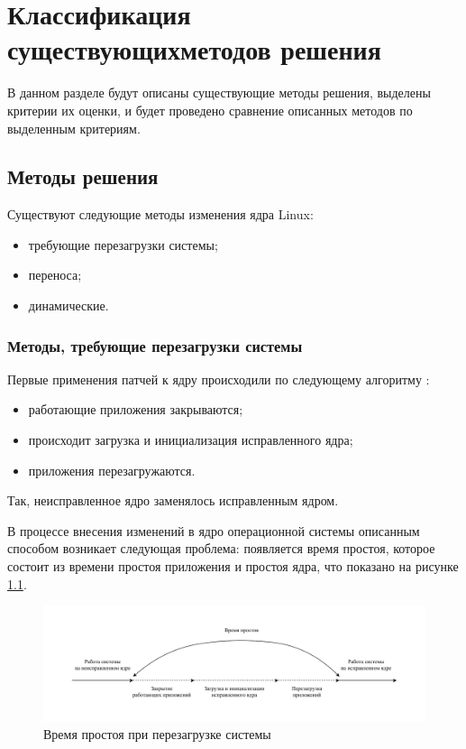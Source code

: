 \chapter{Классификация существующих\newline методов решения}

В данном разделе будут описаны существующие методы решения, выделены критерии их оценки, и будет проведено сравнение описанных методов по выделенным критериям.

\section{Методы решения}

Существуют следующие методы изменения ядра Linux:

\begin{itemize}
	\item требующие перезагрузки системы;
	\item переноса;
	\item динамические.
\end{itemize}

\subsection{Методы, требующие перезагрузки системы}

Первые применения патчей к ядру происходили по следующему алгоритму \cite{dwarf}:

\begin{itemize}
	\item работающие приложения закрываются;
	\item происходит загрузка и инициализация исправленного ядра;
	\item приложения перезагружаются.
\end{itemize}

Так, неисправленное ядро заменялось исправленным ядром. 

В процессе внесения изменений в ядро операционной системы описанным способом возникает следующая проблема: появляется время простоя, которое состоит из времени простоя приложения и простоя ядра, что показано на рисунке \ref{img:downtime}.

\begin{figure}[H]
	\begin{center}
		\includegraphics[scale=0.7]{img/downtime.pdf}
	\end{center}
	\captionsetup{justification=centering}
	\caption{Время простоя при перезагрузке системы}
	\label{img:downtime}
\end{figure}


